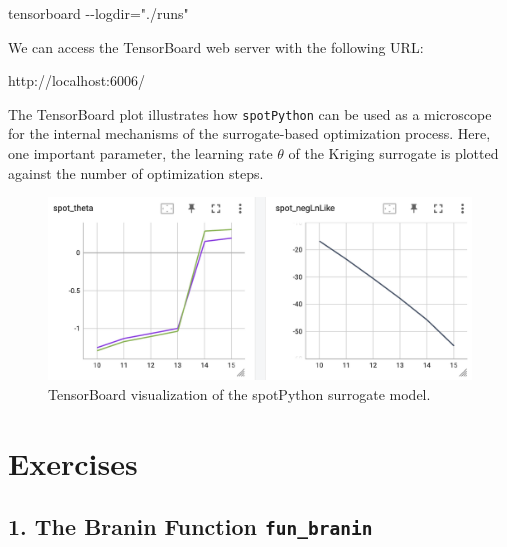 \documentclass[
  letterpaper,
  DIV=11,
  numbers=noendperiod]{scrreprt}
\newenvironment{Shaded}{\begin{snugshade}}{\end{snugshade}}
\newcommand{\NormalTok}[1]{\textcolor[rgb]{0.00,0.23,0.31}{#1}}
\begin{document}
\begin{Shaded}
\begin{Highlighting}[]
\NormalTok{tensorboard {-}{-}logdir="./runs"}
\end{Highlighting}
\end{Shaded}

We can access the TensorBoard web server with the following URL:

\begin{Shaded}
\begin{Highlighting}[]
\NormalTok{http://localhost:6006/}
\end{Highlighting}
\end{Shaded}

The TensorBoard plot illustrates how \texttt{spotPython} can be used as
a microscope for the internal mechanisms of the surrogate-based
optimization process. Here, one important parameter, the learning rate
\(\theta\) of the Kriging surrogate is plotted against the number of
optimization steps.

\begin{figure}[H]

{\centering \includegraphics[width=1\textwidth,height=\textheight]{figures_static/03_tensorboard_03.png}

}

\caption{TensorBoard visualization of the spotPython surrogate model.}

\end{figure}%

\section{Exercises}\label{exercises-3}

\subsection{\texorpdfstring{1. The Branin Function
\texttt{fun\_branin}}{1. The Branin Function fun\_branin}}\label{the-branin-function-fun_branin}
\end{document}
